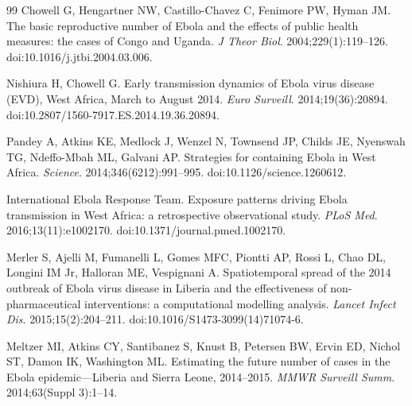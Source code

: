 \documentclass[preprint,12pt,numbers]{elsarticle}
\begin{document}
\begin{thebibliography}{99}
 Chowell G, Hengartner NW, Castillo-Chavez C,
Fenimore PW, Hyman JM. The basic reproductive number of Ebola and the
effects of public health measures: the cases of Congo and Uganda.
\emph{J Theor Biol}. 2004;229(1):119--126. doi:10.1016/j.jtbi.2004.03.006.

 Nishiura H, Chowell G. Early transmission dynamics
of Ebola virus disease (EVD), West Africa, March to August 2014.
\emph{Euro Surveill}. 2014;19(36):20894.
doi:10.2807/1560-7917.ES.2014.19.36.20894.

 Pandey A, Atkins KE, Medlock J, Wenzel N, Townsend
JP, Childs JE, Nyenswah TG, Ndeffo-Mbah ML, Galvani AP. Strategies for
containing Ebola in West Africa. \emph{Science}. 2014;346(6212):991--995.
doi:10.1126/science.1260612.

 International Ebola Response Team. Exposure
patterns driving Ebola transmission in West Africa: a retrospective
observational study. \emph{PLoS Med}. 2016;13(11):e1002170.
doi:10.1371/journal.pmed.1002170.

 Merler S, Ajelli M, Fumanelli L, Gomes MFC, Piontti
AP, Rossi L, Chao DL, Longini IM Jr, Halloran ME, Vespignani A.
Spatiotemporal spread of the 2014 outbreak of Ebola virus disease in
Liberia and the effectiveness of non-pharmaceutical interventions: a
computational modelling analysis. \emph{Lancet Infect Dis}.
2015;15(2):204--211. doi:10.1016/S1473-3099(14)71074-6.

 Meltzer MI, Atkins CY, Santibanez S, Knust B,
Petersen BW, Ervin ED, Nichol ST, Damon IK, Washington ML. Estimating
the future number of cases in the Ebola epidemic---Liberia and Sierra
Leone, 2014--2015. \emph{MMWR Surveill Summ}. 2014;63(Suppl 3):1--14.

\end{thebibliography}
\end{document}
